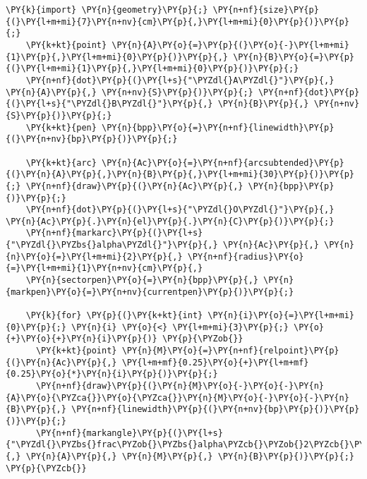 \begin{Verbatim}[commandchars=\\\{\}]
    \PY{k}{import} \PY{n}{geometry}\PY{p}{;} \PY{n+nf}{size}\PY{p}{(}\PY{l+m+mi}{7}\PY{n+nv}{cm}\PY{p}{,}\PY{l+m+mi}{0}\PY{p}{)}\PY{p}{;}
    \PY{k+kt}{point} \PY{n}{A}\PY{o}{=}\PY{p}{(}\PY{o}{-}\PY{l+m+mi}{1}\PY{p}{,}\PY{l+m+mi}{0}\PY{p}{)}\PY{p}{,} \PY{n}{B}\PY{o}{=}\PY{p}{(}\PY{l+m+mi}{1}\PY{p}{,}\PY{l+m+mi}{0}\PY{p}{)}\PY{p}{;}
    \PY{n+nf}{dot}\PY{p}{(}\PY{l+s}{"\PYZdl{}A\PYZdl{}"}\PY{p}{,} \PY{n}{A}\PY{p}{,} \PY{n+nv}{S}\PY{p}{)}\PY{p}{;} \PY{n+nf}{dot}\PY{p}{(}\PY{l+s}{"\PYZdl{}B\PYZdl{}"}\PY{p}{,} \PY{n}{B}\PY{p}{,} \PY{n+nv}{S}\PY{p}{)}\PY{p}{;}
    \PY{k+kt}{pen} \PY{n}{bpp}\PY{o}{=}\PY{n+nf}{linewidth}\PY{p}{(}\PY{n+nv}{bp}\PY{p}{)}\PY{p}{;}

    \PY{k+kt}{arc} \PY{n}{Ac}\PY{o}{=}\PY{n+nf}{arcsubtended}\PY{p}{(}\PY{n}{A}\PY{p}{,}\PY{n}{B}\PY{p}{,}\PY{l+m+mi}{30}\PY{p}{)}\PY{p}{;} \PY{n+nf}{draw}\PY{p}{(}\PY{n}{Ac}\PY{p}{,} \PY{n}{bpp}\PY{p}{)}\PY{p}{;}
    \PY{n+nf}{dot}\PY{p}{(}\PY{l+s}{"\PYZdl{}O\PYZdl{}"}\PY{p}{,} \PY{n}{Ac}\PY{p}{.}\PY{n}{el}\PY{p}{.}\PY{n}{C}\PY{p}{)}\PY{p}{;}
    \PY{n+nf}{markarc}\PY{p}{(}\PY{l+s}{"\PYZdl{}\PYZbs{}alpha\PYZdl{}"}\PY{p}{,} \PY{n}{Ac}\PY{p}{,} \PY{n}{n}\PY{o}{=}\PY{l+m+mi}{2}\PY{p}{,} \PY{n+nf}{radius}\PY{o}{=}\PY{l+m+mi}{1}\PY{n+nv}{cm}\PY{p}{,}
    \PY{n}{sectorpen}\PY{o}{=}\PY{n}{bpp}\PY{p}{,} \PY{n}{markpen}\PY{o}{=}\PY{n+nv}{currentpen}\PY{p}{)}\PY{p}{;}

    \PY{k}{for} \PY{p}{(}\PY{k+kt}{int} \PY{n}{i}\PY{o}{=}\PY{l+m+mi}{0}\PY{p}{;} \PY{n}{i} \PY{o}{<} \PY{l+m+mi}{3}\PY{p}{;} \PY{o}{+}\PY{o}{+}\PY{n}{i}\PY{p}{)} \PY{p}{\PYZob{}}
      \PY{k+kt}{point} \PY{n}{M}\PY{o}{=}\PY{n+nf}{relpoint}\PY{p}{(}\PY{n}{Ac}\PY{p}{,} \PY{l+m+mf}{0.25}\PY{o}{+}\PY{l+m+mf}{0.25}\PY{o}{*}\PY{n}{i}\PY{p}{)}\PY{p}{;}
      \PY{n+nf}{draw}\PY{p}{(}\PY{n}{M}\PY{o}{-}\PY{o}{-}\PY{n}{A}\PY{o}{\PYZca{}}\PY{o}{\PYZca{}}\PY{n}{M}\PY{o}{-}\PY{o}{-}\PY{n}{B}\PY{p}{,} \PY{n+nf}{linewidth}\PY{p}{(}\PY{n+nv}{bp}\PY{p}{)}\PY{p}{)}\PY{p}{;}
      \PY{n+nf}{markangle}\PY{p}{(}\PY{l+s}{"\PYZdl{}\PYZbs{}frac\PYZob{}\PYZbs{}alpha\PYZcb{}\PYZob{}2\PYZcb{}\PYZdl{}"}\PY{p}{,} \PY{n}{A}\PY{p}{,} \PY{n}{M}\PY{p}{,} \PY{n}{B}\PY{p}{)}\PY{p}{;} \PY{p}{\PYZcb{}}
\end{Verbatim}
